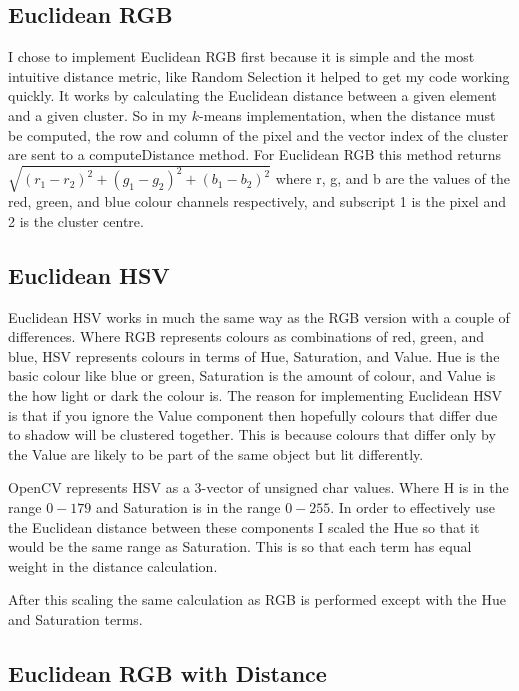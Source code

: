 \documentclass{article}
\begin{document}
\subsection{Euclidean RGB}

I chose to implement Euclidean RGB first because it is simple and the most intuitive distance metric, like Random Selection it helped to get my code working quickly. It works by calculating the Euclidean distance between a given element and a given cluster. So in my $k$-means implementation, when the distance must be computed, the row and column of the pixel and the vector index of the cluster are sent to a computeDistance method. For Euclidean RGB this method returns $\sqrt{(r_1-r_2)^2 + (g_1-g_2)^2 + (b_1-b_2)^2}$ where r, g, and b are the values of the red, green, and blue colour channels respectively, and subscript 1 is the pixel and 2 is the cluster centre. 

\subsection{Euclidean HSV}

Euclidean HSV works in much the same way as the RGB version with a couple of differences. Where RGB represents colours as combinations of red, green, and blue, HSV represents colours in terms of Hue, Saturation, and Value. Hue is the basic colour like blue or green, Saturation is the amount of colour, and Value is the how light or dark the colour is. The reason for implementing Euclidean HSV is that if you ignore the Value component then hopefully colours that differ due to shadow will be clustered together. This is because colours that differ only by the Value are likely to be part of the same object but lit differently.

OpenCV represents HSV as a 3-vector of unsigned char values. Where H is in the range $0-179$ and Saturation is in the range $0-255$. In order to effectively use the Euclidean distance between these components I scaled the Hue so that it would be the same range as Saturation. This is so that each term has equal weight in the distance calculation. 

After this scaling the same calculation as RGB is performed except with the Hue and Saturation terms. 

\subsection{Euclidean RGB with Distance}
\end{document}
